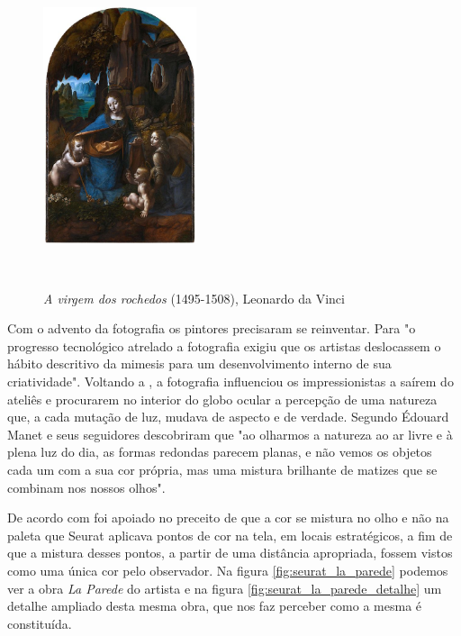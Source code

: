 \begin{figure}[H]
  \begin{center}
    \caption{\textit{A virgem dos rochedos} (1495-1508), Leonardo da Vinci}
    \vspace*{0,2cm}
    \includegraphics[width=0.4\textwidth]{./04-figuras/da_vinci_virgem_rochedos}
    \label{fig:da_vinci_virgem_rochedos}
  \end{center}
  \vspace*{-0,9cm}
  \\
\end{figure}

Com o advento da fotografia os pintores precisaram se reinventar. Para  "o progresso tecnológico atrelado a fotografia exigiu que os artistas deslocassem o hábito descritivo da mimesis para um desenvolvimento interno de sua criatividade". Voltando a , a fotografia influenciou os impressionistas a saírem do ateliês e procurarem no interior do globo ocular a percepção de uma natureza que, a cada mutação de luz, mudava de aspecto e de verdade. Segundo  Édouard Manet e seus seguidores descobriram que "ao olharmos a natureza ao ar livre e à plena luz do dia, as formas redondas parecem planas, e não vemos os objetos cada um com a sua cor própria, mas uma mistura brilhante de matizes que se combinam nos nossos olhos".


De acordo com  foi apoiado no preceito de que a cor se mistura no olho e não na paleta que Seurat aplicava pontos de cor na tela, em locais estratégicos, a fim de que a mistura desses pontos, a partir de uma distância apropriada, fossem vistos como uma única cor pelo observador. Na figura \ref{fig:seurat_la_parede} podemos ver a obra  \textit{La Parede} do artista e na figura \ref{fig:seurat_la_parede_detalhe} um detalhe ampliado desta mesma obra, que nos faz perceber como a mesma é constituída.


